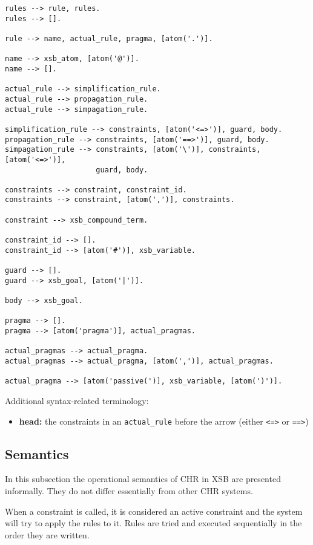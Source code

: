 \begin{verbatim}
rules --> rule, rules.
rules --> [].

rule --> name, actual_rule, pragma, [atom('.')].

name --> xsb_atom, [atom('@')].
name --> [].

actual_rule --> simplification_rule.
actual_rule --> propagation_rule.
actual_rule --> simpagation_rule.

simplification_rule --> constraints, [atom('<=>')], guard, body.
propagation_rule --> constraints, [atom('==>')], guard, body.
simpagation_rule --> constraints, [atom('\')], constraints, [atom('<=>')], 
                     guard, body.

constraints --> constraint, constraint_id.
constraints --> constraint, [atom(',')], constraints.

constraint --> xsb_compound_term.

constraint_id --> [].
constraint_id --> [atom('#')], xsb_variable.

guard --> [].
guard --> xsb_goal, [atom('|')].

body --> xsb_goal.

pragma --> [].
pragma --> [atom('pragma')], actual_pragmas.

actual_pragmas --> actual_pragma.
actual_pragmas --> actual_pragma, [atom(',')], actual_pragmas.

actual_pragma --> [atom('passive(')], xsb_variable, [atom(')')].

\end{verbatim}

Additional syntax-related terminology:

\begin{itemize}
\item \textbf{head:} the constraints in an \texttt{actual\_rule} before
                     the arrow (either \texttt{<=>} or \texttt{==>})
\end{itemize}

\subsection{Semantics}

In this subsection the operational semantics of CHR in XSB are presented
informally. They do not differ essentially from other CHR systems.

When a constraint is called, it is considered an active constraint and
the system will try to apply the rules to it. Rules are tried and executed
sequentially in the order they are written. 

